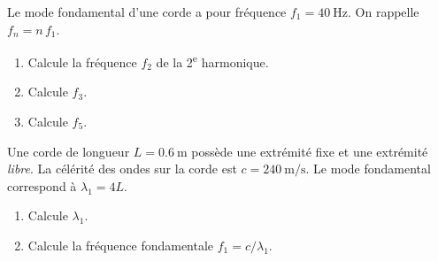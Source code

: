 \documentclass[11pt,a4paper]{article}
\begin{document}
\begin{exo}
Le mode fondamental d'une corde a pour fréquence $f_1=\SI{40}{\hertz}$. On rappelle $f_n=n\,f_1$.
\begin{enumerate}[label=\alph*)]
  \item Calcule la fréquence $f_2$ de la 2\textsuperscript{e} harmonique.
  \item Calcule $f_3$.
  \item Calcule $f_5$.
\end{enumerate}
\end{exo}

\begin{exo}
Une corde de longueur $L=\SI{0.6}{\metre}$ possède une extrémité fixe et une extrémité
\emph{libre}. La célérité des ondes sur la corde est $c=\SI{240}{\metre\per\second}$. Le mode
fondamental correspond à $\lambda_1=4L$.
\begin{enumerate}[label=\alph*)]
  \item Calcule $\lambda_1$.
  \item Calcule la fréquence fondamentale $f_1=c/\lambda_1$.
\end{enumerate}
\end{exo}
\end{document}
